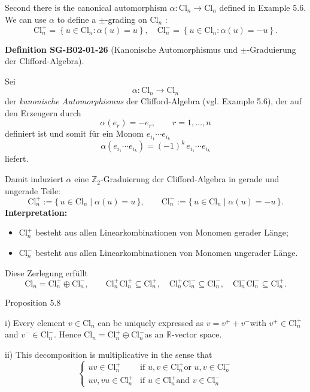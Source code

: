 \documentclass[10pt, letterpaper]{article}
\newcommand{\Cl}{\mathrm{Cl}}
\newcommand{\CustomHeading}[3]{%
  \par\medskip\noindent%
  \textbf{#1 #2} \textnormal{(#3)}.\enskip%
}
\newenvironment{DEF}[2]{\begin{unitbox}\CustomHeading{Definition}{#1}{#2}}{\end{unitbox}}
\begin{document}
Second there is the canonical automorphism $\alpha: \mathrm{Cl}_{n} \longrightarrow \mathrm{Cl}_{n}$ defined in Example 5.6. We can use $\alpha$ to define a $\pm$-grading on $\mathrm{Cl}_{n}$ :
$$
\mathrm{Cl}_{n}^{+}=\left\{u \in \mathrm{Cl}_{n}: \alpha(u)=u\right\}, \quad \mathrm{Cl}_{n}^{-}=\left\{u \in \mathrm{Cl}_{n}: \alpha(u)=-u\right\} .
$$


\begin{DEF}{SG-B02-01-26}{Kanonische Automorphismus und $\pm$-Graduierung der Clifford-Algebra}
Sei 
\[
\alpha:\Cl_n\longrightarrow\Cl_n
\]
der \emph{kanonische Automorphismus} der Clifford-Algebra (vgl. Example 5.6), der auf den Erzeugern durch
\[
\alpha(e_r)=-e_r, \qquad r=1,\dots,n
\]
definiert ist und somit für ein Monom \(e_{i_1}\cdots e_{i_k}\)
\[
\alpha(e_{i_1}\cdots e_{i_k})=(-1)^k\,e_{i_1}\cdots e_{i_k}
\]
liefert.

Damit induziert $\alpha$ eine $\mathbb{Z}_2$-Graduierung der Clifford-Algebra in gerade und ungerade Teile:
\[
\Cl_n^+ := \{\,u\in\Cl_n \mid \alpha(u)=u\,\},
\qquad
\Cl_n^- := \{\,u\in\Cl_n \mid \alpha(u)=-u\,\}.
\]
\textbf{Interpretation:}
\begin{itemize}
  \item $\Cl_n^+$ besteht aus allen Linearkombinationen von Monomen gerader Länge;
  \item $\Cl_n^-$ besteht aus allen Linearkombinationen von Monomen ungerader Länge.
\end{itemize}
Diese Zerlegung erfüllt
\[
\Cl_n = \Cl_n^+ \oplus \Cl_n^-,
\qquad
\Cl_n^+\Cl_n^+\subseteq\Cl_n^+,\quad
\Cl_n^+\Cl_n^-\subseteq\Cl_n^-,\quad
\Cl_n^-\Cl_n^-\subseteq\Cl_n^+.
\]
\end{DEF}



Proposition 5.8

i) Every element $v \in \mathrm{Cl}_{n}$ can be uniquely expressed as $v=v^{+}+v^{-}$with $v^{+} \in \mathrm{Cl}_{n}^{+}$and $v^{-} \in \mathrm{Cl}_{n}^{-}$. Hence $\mathrm{Cl}_{n}=\mathrm{Cl}_{n}^{+} \oplus \mathrm{Cl}_{n}^{-}$as an $\mathbb{R}$-vector space.

ii) This decomposition is multiplicative in the sense that
$$
\begin{cases}u v \in \mathrm{Cl}_{n}^{+} & \text {if } u, v \in \mathrm{Cl}_{n}^{+} \text {or } u, v \in \mathrm{Cl}_{n}^{-} \\ u v, v u \in \mathrm{Cl}_{n}^{+} & \text {if } u \in \mathrm{Cl}_{n}^{+} \text {and } v \in \mathrm{Cl}_{n}^{-}\end{cases}
$$
\end{document}

